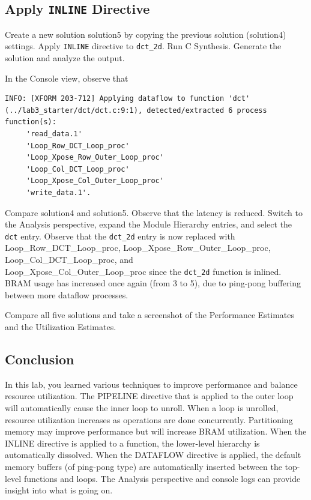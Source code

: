 \documentclass[a4paper,12pt,twoside]{article}
\begin{document}
\subsection{Apply \texttt{INLINE} Directive}\label{S37}
Create a new solution solution5 by copying the previous solution (solution4) settings. Apply \texttt{INLINE} directive to \texttt{dct\_2d}. Run C Synthesis. Generate the solution and analyze the output.

In the Console view, observe that
\begin{verbatim}
INFO: [XFORM 203-712] Applying dataflow to function 'dct' (../lab3_starter/dct/dct.c:9:1), detected/extracted 6 process function(s): 
	 'read_data.1'
	 'Loop_Row_DCT_Loop_proc'
	 'Loop_Xpose_Row_Outer_Loop_proc'
	 'Loop_Col_DCT_Loop_proc'
	 'Loop_Xpose_Col_Outer_Loop_proc'
	 'write_data.1'.
\end{verbatim}
Compare solution4 and solution5. Observe that the latency is reduced. Switch to the Analysis perspective, expand the Module Hierarchy entries, and select the \texttt{dct} entry. Observe that the \texttt{dct\_2d} entry is now replaced with Loop\_Row\_DCT\_Loop\_proc, Loop\_Xpose\_Row\_Outer\_Loop\_proc, Loop\_Col\_DCT\_Loop\_proc, and\\
Loop\_Xpose\_Col\_Outer\_Loop\_proc since the \texttt{dct\_2d} function is inlined. BRAM usage has increased once again (from 3 to 5), due to ping-pong buffering between more dataflow processes.

Compare all five solutions and take a screenshot of the Performance Estimates and the Utilization Estimates.
\subsection{Conclusion}\label{S3Con}
In this lab, you learned various techniques to improve performance and balance resource utilization. The PIPELINE directive that is applied to the outer loop will automatically cause the inner loop to unroll. When a loop is unrolled, resource utilization increases as operations are done concurrently. Partitioning memory may improve performance but will increase BRAM utilization. When the INLINE directive is applied to a function, the lower-level hierarchy is automatically dissolved. When the DATAFLOW directive is applied, the
default memory buffers (of ping-pong type) are automatically inserted between the top-level functions and loops. The Analysis perspective and console logs can provide insight into what is going on.
\end{document}

